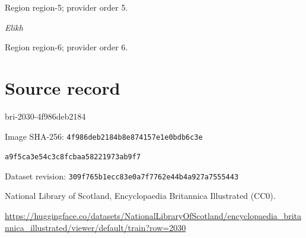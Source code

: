 \documentclass[11pt]{article}
\begin{document}
{\scriptsize\color{gray} Region region-5; provider order 5.\par}
\medskip

{\small\itshape Elikh\par}

{\scriptsize\color{gray} Region region-6; provider order 6.\par}
\medskip
\newpage\section*{Source record}
bri-2030-4f986deb2184\par
Image SHA-256: \texttt{4f986deb2184b8e874157e1e0bdb6c3e}\par\texttt{a9f5ca3e54c3c8fcbaa58221973ab9f7}\par
Dataset revision: \texttt{309f765b1ecc83e0a7f7}\texttt{762e44b4a927a7555443}\par
National Library of Scotland, Encyclopaedia Britannica Illustrated (CC0).\par
\url{https://huggingface.co/datasets/NationalLibraryOfScotland/encyclopaedia_britannica_illustrated/viewer/default/train?row=2030}
\end{document}
